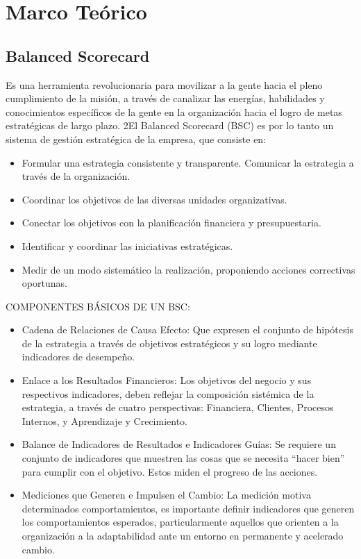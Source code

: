 \section{Marco Teórico} 
\subsection{Balanced Scorecard}
Es una herramienta revolucionaria para movilizar a la gente hacia el pleno cumplimiento de la misión, a través de canalizar las energías, habilidades y conocimientos específicos de la gente en la organización hacia el logro de metas estratégicas de largo plazo. 2El Balanced Scorecard (BSC) es por lo tanto un sistema de gestión estratégica de la empresa, que consiste en:

\begin{itemize}
\item Formular una estrategia consistente y transparente.  Comunicar la estrategia a través de la organización.
\item Coordinar los objetivos de las diversas unidades organizativas.
\item Conectar los objetivos con la planificación financiera y presupuestaria.
\item Identificar y coordinar las iniciativas estratégicas. 
\item Medir de un modo sistemático la realización, proponiendo acciones correctivas oportunas.
\end{itemize}



COMPONENTES BÁSICOS DE UN BSC:

\begin{itemize}
\item Cadena de Relaciones de Causa Efecto: Que expresen el conjunto de hipótesis de la estrategia a través de objetivos estratégicos y su logro mediante indicadores de desempeño.
\item Enlace a los Resultados Financieros: Los objetivos del negocio y sus respectivos indicadores, deben reflejar la composición sistémica de la estrategia, a través de cuatro perspectivas: Financiera, Clientes, Procesos Internos, y Aprendizaje y Crecimiento.
\item Balance de Indicadores de Resultados e Indicadores Guías: Se requiere un conjunto de indicadores que muestren las cosas que se necesita “hacer bien” para cumplir con el objetivo. Estos miden el progreso de las acciones. 
\item Mediciones que Generen e Impulsen el Cambio: La medición motiva determinados comportamientos, es importante definir indicadores que generen los comportamientos esperados, particularmente aquellos que orienten a la organización a la adaptabilidad ante un entorno en permanente y acelerado cambio.

\end{itemize}


